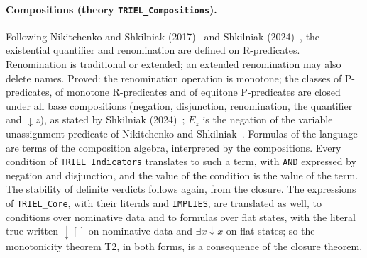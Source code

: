 \documentclass[11pt,a4paper]{article}
\begin{document}
\paragraph{Compositions (theory \texttt{TRIEL\_Compositions}).}
Following Nikitchenko and Shkilniak (2017)~\cite{NikitchenkoShkilniak2017} and Shkilniak
(2024)~\cite{Shkilniak2024}, the existential
quantifier and renomination are defined on R-predicates. Renomination is traditional or
extended; an extended renomination may also delete names. Proved: the renomination
operation is monotone; the classes of P-predicates, of monotone R-predicates and of
equitone P-predicates are closed under all base compositions (negation, disjunction,
renomination, the quantifier and $\downarrow z$), as stated by Shkilniak (2024)~\cite{Shkilniak2024}; $E_z$ is
the negation of the variable unassignment predicate of Nikitchenko and
Shkilniak~\cite{NikitchenkoShkilniak2017}.
Formulas of the language are terms of the composition algebra, interpreted by the
compositions. Every condition of \texttt{TRIEL\_Indicators} translates to such a term,
with \texttt{AND} expressed by negation and disjunction, and the value of the condition is
the value of the term. The stability of definite verdicts follows again, from the closure.
The expressions of \texttt{TRIEL\_Core}, with their literals and \texttt{IMPLIES}, are
translated as well, to conditions over nominative data and to formulas over flat states,
with the literal true written $\downarrow[]$ on nominative data and $\exists x \downarrow x$
on flat states; so the monotonicity theorem T2, in both forms, is a consequence of the
closure theorem.
\end{document}
